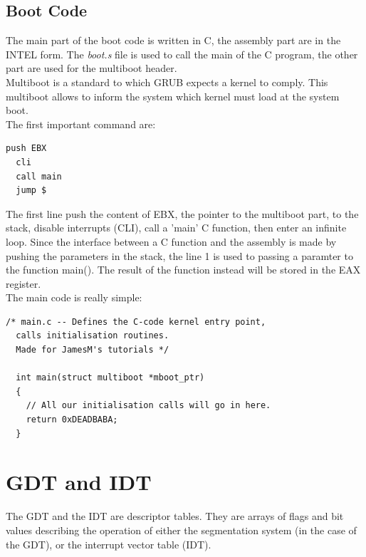 \documentclass[12pt]{article}
\begin{document}
\subsection{Boot Code}
The main part of the boot code is written in C, the assembly part are in the INTEL form. The \textit{boot.s} file is used to call the main of the C program, the other part are used for the multiboot header.\\
Multiboot is a standard to which GRUB expects a kernel to comply. This multiboot allows to inform the system which kernel must load at the system boot.\\
The first important command are:
\begin{lstlisting}[style=CStyle]
  push EBX
  cli
  call main
  jump $
\end{lstlisting}
The first line push the content of EBX, the pointer to the multiboot part, to the stack, disable interrupts (CLI), call a 'main' C function, then enter an infinite loop. Since the interface between a C function and the assembly is made by pushing the parameters in the stack, the line 1 is used to passing a paramter to the function main(). The result of the function instead will be stored in the EAX register.\\
The main code is really simple:
\begin{lstlisting}[style=CStyle]
  /* main.c -- Defines the C-code kernel entry point,
  calls initialisation routines.
  Made for JamesM's tutorials */

  int main(struct multiboot *mboot_ptr)
  {
    // All our initialisation calls will go in here.
    return 0xDEADBABA;
  }
\end{lstlisting}

\section{GDT and IDT}
The GDT and the IDT are descriptor tables. They are arrays of flags and bit values describing the operation of either the segmentation system (in the case of the GDT), or the interrupt vector table (IDT).
\end{document}
